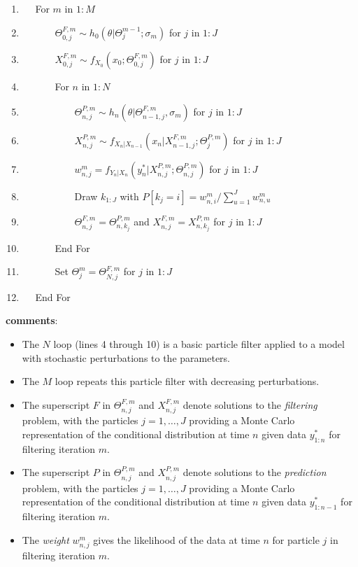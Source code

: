 \documentclass[]{article}
\providecommand{\tightlist}{%
  \setlength{\itemsep}{0pt}\setlength{\parskip}{0pt}}
\begin{document}
\begin{enumerate}
\def\labelenumi{\arabic{enumi}.}
\tightlist
\item
  \(\quad\) For \(m\) in \(1{:} M\)
\item
  \(\quad\quad\quad\)
  \(\Theta^{F,m}_{0,j}\sim h_0(\theta|\Theta^{m-1}_{j}; \sigma_m)\) for
  \(j\) in \(1{:} J\)
\item
  \(\quad\quad\quad\)
  \(X_{0,j}^{F,m}\sim f_{X_0}(x_0 ; \Theta^{F,m}_{0,j})\) for \(j\) in
  \(1{:} J\)
\item
  \(\quad\quad\quad\) For \(n\) in \(1{:} N\)
\item
  \(\quad\quad\quad\quad\quad\)
  \(\Theta^{P,m}_{n,j}\sim h_n(\theta|\Theta^{F,m}_{n-1,j},\sigma_m)\)
  for \(j\) in \(1{:} J\)
\item
  \(\quad\quad\quad\quad\quad\)
  \(X_{n,j}^{P,m}\sim f_{X_n|X_{n-1}}(x_n | X^{F,m}_{n-1,j}; \Theta^{P,m}_j)\)
  for \(j\) in \(1{:} J\)
\item
  \(\quad\quad\quad\quad\quad\)
  \(w_{n,j}^m = f_{Y_n|X_n}(y^*_n| X_{n,j}^{P,m} ; \Theta^{P,m}_{n,j})\)
  for \(j\) in \(1{:} J\)
\item
  \(\quad\quad\quad\quad\quad\) Draw \(k_{1{:}J}\) with
  \(P[k_j=i]= w_{n,i}^m\Big/\sum_{u=1}^J w_{n,u}^m\)
\item
  \(\quad\quad\quad\quad\quad\)
  \(\Theta^{F,m}_{n,j}=\Theta^{P,m}_{n,k_j}\) and
  \(X^{F,m}_{n,j}=X^{P,m}_{n,k_j}\) for \(j\) in \(1{:} J\)
\item
  \(\quad\quad\quad\) End For
\item
  \(\quad\quad\quad\) Set \(\Theta^{m}_{j}=\Theta^{F,m}_{N,j}\) for
  \(j\) in \(1{:} J\)
\item
  \(\quad\) End For
\end{enumerate}

\textbf{comments}:

\begin{itemize}
\item
  The \(N\) loop (lines 4 through 10) is a basic particle filter applied
  to a model with stochastic perturbations to the parameters.
\item
  The \(M\) loop repeats this particle filter with decreasing
  perturbations.
\item
  The superscript \(F\) in \(\Theta^{F,m}_{n,j}\) and \(X^{F,m}_{n,j}\)
  denote solutions to the \emph{filtering} problem, with the particles
  \(j=1,\dots,J\) providing a Monte Carlo representation of the
  conditional distribution at time \(n\) given data \(y^*_{1:n}\) for
  filtering iteration \(m\).
\item
  The superscript \(P\) in \(\Theta^{P,m}_{n,j}\) and \(X^{P,m}_{n,j}\)
  denote solutions to the \emph{prediction} problem, with the particles
  \(j=1,\dots,J\) providing a Monte Carlo representation of the
  conditional distribution at time \(n\) given data \(y^*_{1:n-1}\) for
  filtering iteration \(m\).
\item
  The \emph{weight} \(w^m_{n,j}\) gives the likelihood of the data at
  time \(n\) for particle \(j\) in filtering iteration \(m\).
\end{itemize}
\end{document}
